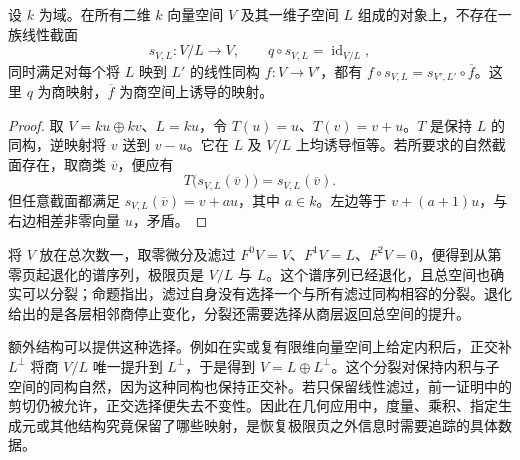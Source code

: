 \begin{proposition}\label{g2:prop:no-natural-filtered-splitting}
	设 \(k\) 为域。在所有二维 \(k\) 向量空间 \(V\) 及其一维子空间 \(L\) 组成的对象上，不存在一族线性截面
	\[
		s_{V,L}:V/L\longrightarrow V,\qquad q\circ s_{V,L}=\operatorname{id}_{V/L},
	\]
	同时满足对每个将 \(L\) 映到 \(L'\) 的线性同构 \(f:V\to V'\)，都有 \(f\circ s_{V,L}=s_{V',L'}\circ\overline f\)。这里 \(q\) 为商映射，\(\overline f\) 为商空间上诱导的映射。
\end{proposition}
\begin{proof}
	取 \(V=ku\oplus kv\)、\(L=ku\)，令 \(T(u)=u\)、\(T(v)=v+u\)。\(T\) 是保持 \(L\) 的同构，逆映射将 \(v\) 送到 \(v-u\)。它在 \(L\) 及 \(V/L\) 上均诱导恒等。若所要求的自然截面存在，取商类 \(\overline v\)，便应有
	\[
		T\bigl(s_{V,L}(\overline v)\bigr)=s_{V,L}(\overline v).
	\]
	但任意截面都满足 \(s_{V,L}(\overline v)=v+au\)，其中 \(a\in k\)。左边等于 \(v+(a+1)u\)，与右边相差非零向量 \(u\)，矛盾。
\end{proof}

将 \(V\) 放在总次数一，取零微分及滤过 \(F^0V=V\)、\(F^1V=L\)、\(F^2V=0\)，便得到从第零页起退化的谱序列，极限页是 \(V/L\) 与 \(L\)。这个谱序列已经退化，且总空间也确实可以分裂；命题指出，滤过自身没有选择一个与所有滤过同构相容的分裂。退化给出的是各层相邻商停止变化，分裂还需要选择从商层返回总空间的提升。

\ProseParagraphBreak

额外结构可以提供这种选择。例如在实或复有限维向量空间上给定内积后，正交补 \(L^\perp\) 将商 \(V/L\) 唯一提升到 \(L^\perp\)，于是得到 \(V=L\oplus L^\perp\)。这个分裂对保持内积与子空间的同构自然，因为这种同构也保持正交补。若只保留线性滤过，前一证明中的剪切仍被允许，正交选择便失去不变性。因此在几何应用中，度量、乘积、指定生成元或其他结构究竟保留了哪些映射，是恢复极限页之外信息时需要追踪的具体数据。
